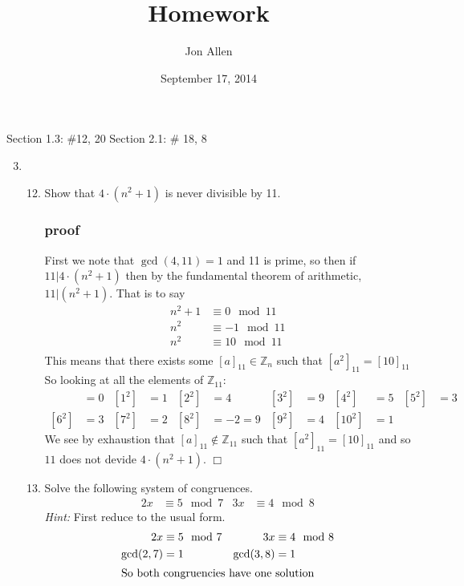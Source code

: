 \documentclass[letterpaper]{article}
\begin{document}
\title{Homework}
\date{September 17, 2014}
\author{Jon Allen}
\maketitle
Section 1.3: \#12, 20
Section 2.1: \# 18, 8
\renewcommand{\labelenumi}{1.\arabic{enumi}}
\renewcommand{\labelenumii}{\arabic{enumii}.}
\renewcommand{\labelenumiii}{(\alph{enumiii})}
\begin{enumerate}
\setcounter{enumi}{2}
\item
\begin{enumerate}
\setcounter{enumii}{11}
\item
Show that $4\cdot(n^2+1)$ is never divisible by 11.
\subsubsection*{proof}
First we note that $\gcd(4,11)=1$ and 11 is prime, so then if $11|4\cdot(n^2+1)$ then by the fundamental theorem of arithmetic, $11|(n^2+1)$.
That is to say
\begin{align*}
  n^2+1&\equiv0\mod11\\
  n^2&\equiv-1\mod11\\
  n^2&\equiv10\mod11\\
\end{align*}
This means that there exists some $[a]_{11}\in\mathbb{Z}_n$ such that $[a^2]_{11}=[10]_{11}$ So looking at all the elements of $\mathbb{Z}_{11}$:
\begin{align*}
  [0^2]&=0&
  [1^2]&=1&
  [2^2]&=4&
  [3^2]&=9&
  [4^2]&=5&
  [5^2]&=3\\
  [6^2]&=3&
  [7^2]&=2&
  [8^2]&=-2=9&
  [9^2]&=4&
  [10^2]&=1&
\end{align*}
We see by exhaustion that $[a]_{11}\not\in\mathbb{Z}_{11}$ such that $[a^2]_{11}=[10]_{11}$ and so $11$ does not devide $4\cdot(n^2+1)$.
$\Box$
\setcounter{enumii}{19}
\item
Solve the following system of congruences.
\begin{align*}
  2x&\equiv 5\mod 7&3x&\equiv4\mod 8
\end{align*}
\emph{Hint:} First reduce to the usual form.
\begin{align*}
  2x&\equiv 5\mod 7&3x&\equiv4\mod 8\\
  \gcd(2,7)&=1&\gcd(3,8)&=1\\
  \intertext{So both congruencies have one solution}

\end{align*}
\end{enumerate}
\end{enumerate}
\end{document}
